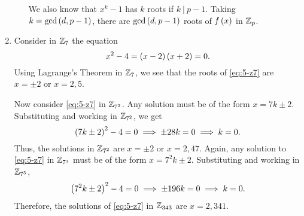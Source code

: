 \documentclass[journal,12pt,onecolumn]{IEEEtran}
\begin{document}
\begin{enumerate}
\begin{enumerate}
        We also know that \(x^k - 1\) has \(k\) roots if \(k\ |\ p - 1\). Taking
        \(k = \gcd\left(d,p-1\right)\), there are \(\gcd\left(d,p-1\right)\) roots of
        \(f\left(x\right)\) in \(\mathbb Z_p\).
    \end{enumerate}

    \item Consider in \(\mathbb Z_7\) the equation
    \begin{equation}
        x^2 - 4 = \left(x-2\right)\left(x+2\right) = 0.
        \label{eq:5-z7}
    \end{equation}
    Using Lagrange's Theorem in \(\mathbb Z_7\), we see that the roots of
    \eqref{eq:5-z7} are \(x = \pm 2\) or \(x = 2,5\).
    
    Now consider \eqref{eq:5-z7} in \(\mathbb Z_{7^2}\). Any solution must be of the
    form \(x = 7k \pm 2\). Substituting and working in \(\mathbb Z_{7^2}\), we get
    \begin{equation}
        \left(7k\pm 2\right)^2 - 4 = 0 \implies \pm 28k = 0 \implies k = 0.
        \label{eq:5-k-z49}
    \end{equation}
    Thus, the solutions in \(\mathbb Z_{7^2}\) are \(x = \pm 2\) or \(x = 2, 47\).
    Again, any solution to \eqref{eq:5-z7} in \(\mathbb Z_{7^3}\) must be of the form
    \(x = 7^2k \pm 2\). Substituting and working in \(\mathbb Z_{7^3}\),
    \begin{equation}
        \left(7^2k \pm 2\right)^2 - 4 = 0 \implies \pm 196k = 0 \implies k = 0.
        \label{eq:5-k-z343}
    \end{equation}
    Therefore, the solutions of \eqref{eq:5-z7} in \(\mathbb Z_{343}\) are \(x = 2,
    341\).
\end{enumerate}
\end{document}
